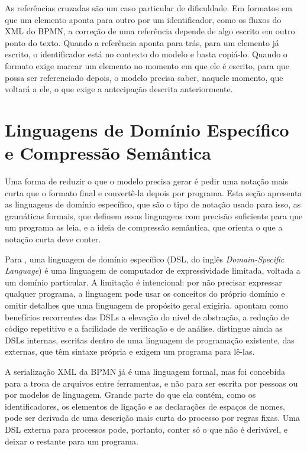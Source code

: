 As referências cruzadas são um caso particular de dificuldade. Em formatos em que um elemento aponta para outro por um identificador, como os fluxos do XML do BPMN, a correção de uma referência depende de algo escrito em outro ponto do texto. Quando a referência aponta para trás, para um elemento já escrito, o identificador está no contexto do modelo e basta copiá-lo. Quando o formato exige marcar um elemento no momento em que ele é escrito, para que possa ser referenciado depois, o modelo precisa saber, naquele momento, que voltará a ele, o que exige a antecipação descrita anteriormente.

\section{Linguagens de Domínio Específico e Compressão Semântica}
\label{sec:dsl-compressao}\label{subsec:dsl}\label{subsec:gramaticas}\label{subsec:compressao-semantica}

Uma forma de reduzir o que o modelo precisa gerar é pedir uma notação mais curta que o formato final e convertê-la depois por programa. Esta seção apresenta as linguagens de domínio específico, que são o tipo de notação usado para isso, as gramáticas formais, que definem essas linguagens com precisão suficiente para que um programa as leia, e a ideia de compressão semântica, que orienta o que a notação curta deve conter.

Para , uma linguagem de domínio específico (DSL, do inglês \textit{Domain-Specific Language}) é uma linguagem de computador de expressividade limitada, voltada a um domínio particular. A limitação é intencional: por não precisar expressar qualquer programa, a linguagem pode usar os conceitos do próprio domínio e omitir detalhes que uma linguagem de propósito geral exigiria.  apontam como benefícios recorrentes das DSLs a elevação do nível de abstração, a redução de código repetitivo e a facilidade de verificação e de análise.  distingue ainda as DSLs internas, escritas dentro de uma linguagem de programação existente, das externas, que têm sintaxe própria e exigem um programa para lê-las.

A serialização XML da BPMN já é uma linguagem formal, mas foi concebida para a troca de arquivos entre ferramentas, e não para ser escrita por pessoas ou por modelos de linguagem. Grande parte do que ela contém, como os identificadores, os elementos de ligação e as declarações de espaços de nomes, pode ser derivada de uma descrição mais curta do processo por regras fixas. Uma DSL externa para processos pode, portanto, conter só o que não é derivável, e deixar o restante para um programa.

